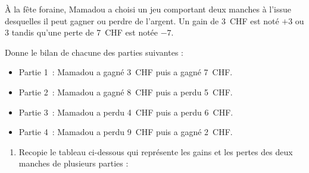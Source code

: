 \begin{activite}

À la fête foraine, Mamadou a choisi un jeu comportant deux manches à l'issue desquelles il peut gagner ou perdre de l'argent. Un gain de 3 CHF est noté $+3$ ou 3 tandis qu'une perte de 7 CHF est notée $-7$.
\begin{partie}
Donne le bilan de chacune des parties suivantes :
\begin{itemize}
\item Partie 1 : Mamadou a gagné 3 CHF puis a gagné 7 CHF.
\item Partie 2 : Mamadou a gagné 8 CHF puis a perdu 5 CHF.
\item Partie 3 : Mamadou a perdu 4 CHF puis a perdu 6 CHF.
\item Partie 4 : Mamadou a perdu 9 CHF puis a gagné 2 CHF.
\end{itemize}
\end{partie}

\begin{partie}
\begin{enumerate}
 \item Recopie le tableau ci-dessous qui représente les gains et les pertes des deux manches de plusieurs parties :
 

\end{enumerate}
\end{partie}
\end{activite}
